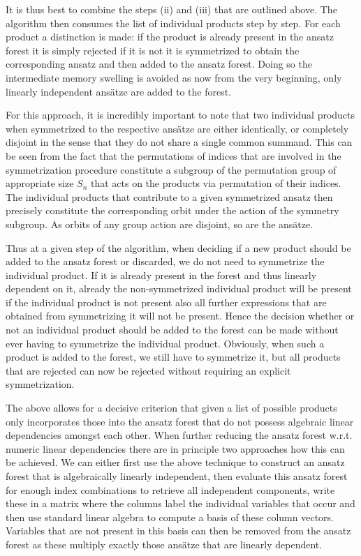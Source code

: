 It is thus best to combine the steps (ii) and (iii) that are outlined above. The algorithm then consumes the list of individual products step by step. For each product a distinction is made: if the product is already present in the ansatz forest it is simply rejected if it is not it is symmetrized to obtain the corresponding ansatz and then added to the ansatz forest. Doing so the intermediate memory swelling is avoided as now from the very beginning, only linearly independent ansätze are added to the forest.

For this approach, it is incredibly important to note that two individual products when symmetrized to the respective ansätze are either identically, or completely disjoint in the sense that they do not share a single common summand. This can be seen from the fact that the permutations of indices that are involved in the symmetrization procedure constitute a subgroup of the permutation group of appropriate size $S_n$ that acts on the products via permutation of their indices. The individual products that contribute to a given symmetrized ansatz then precisely constitute the corresponding orbit under the action of the symmetry subgroup. As orbits of any group action are disjoint, so are the ansätze. 

Thus at a given step of the algorithm, when deciding if a new product should be added to the ansatz forest or discarded, we do not need to symmetrize the individual product. If it is already present in the forest and thus linearly dependent on it, already the non-symmetrized individual product will be present if the individual product is not present also all further expressions that are obtained from symmetrizing it will not be present. Hence the decision whether or not an individual product should be added to the forest can be made without ever having to symmetrize the individual product. Obviously, when such a product is added to the forest, we still have to symmetrize it, but all products that are rejected can now be rejected without requiring an explicit symmetrization.

The above allows for a decisive criterion that given a list of possible products only incorporates those into the ansatz forest that do not possess algebraic linear dependencies amongst each other. When further reducing the ansatz forest w.r.t. numeric linear dependencies there are in principle two approaches how this can be achieved. We can either first use the above technique to construct an ansatz forest that is algebraically linearly independent, then evaluate this ansatz forest for enough index combinations to retrieve all independent components, write these in a matrix where the columns label the individual variables that occur and then use standard linear algebra to compute a basis of these column vectors. Variables that are not present in this basis can then be removed from the ansatz forest as these multiply exactly those ansätze that are linearly dependent. 

